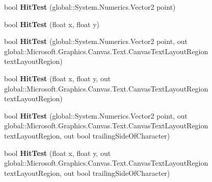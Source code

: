 \begin{DoxyCompactItemize}
\item 
\mbox{\label{class_microsoft_1_1_graphics_1_1_canvas_1_1_text_1_1_canvas_text_layout_a096ba89ae4dafe4d7af99c68f87facb2}} 
bool {\bfseries Hit\+Test} (global\+::\+System.\+Numerics.\+Vector2 point)
\item 
\mbox{\label{class_microsoft_1_1_graphics_1_1_canvas_1_1_text_1_1_canvas_text_layout_abe577fdf1f6c6ac76801fb8eee342738}} 
bool {\bfseries Hit\+Test} (float x, float y)
\item 
\mbox{\label{class_microsoft_1_1_graphics_1_1_canvas_1_1_text_1_1_canvas_text_layout_acf6969a305076eb5ecd8ad98552ed8a5}} 
bool {\bfseries Hit\+Test} (global\+::\+System.\+Numerics.\+Vector2 point, out global\+::\+Microsoft.\+Graphics.\+Canvas.\+Text.\+Canvas\+Text\+Layout\+Region text\+Layout\+Region)
\item 
\mbox{\label{class_microsoft_1_1_graphics_1_1_canvas_1_1_text_1_1_canvas_text_layout_a39dc3babff6a75fb4e1468efdcf2ad6e}} 
bool {\bfseries Hit\+Test} (float x, float y, out global\+::\+Microsoft.\+Graphics.\+Canvas.\+Text.\+Canvas\+Text\+Layout\+Region text\+Layout\+Region)
\item 
\mbox{\label{class_microsoft_1_1_graphics_1_1_canvas_1_1_text_1_1_canvas_text_layout_a532b1b13e054c3c5b5547158050e3b94}} 
bool {\bfseries Hit\+Test} (global\+::\+System.\+Numerics.\+Vector2 point, out global\+::\+Microsoft.\+Graphics.\+Canvas.\+Text.\+Canvas\+Text\+Layout\+Region text\+Layout\+Region, out bool trailing\+Side\+Of\+Character)
\item 
\mbox{\label{class_microsoft_1_1_graphics_1_1_canvas_1_1_text_1_1_canvas_text_layout_a2bf7d833ba8cf12cacb9b8c441309e4e}} 
bool {\bfseries Hit\+Test} (float x, float y, out global\+::\+Microsoft.\+Graphics.\+Canvas.\+Text.\+Canvas\+Text\+Layout\+Region text\+Layout\+Region, out bool trailing\+Side\+Of\+Character)
\item 

\end{DoxyCompactItemize}

